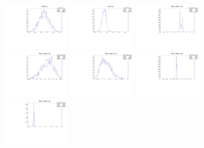 \begin{figure}[tb]
\begin{center}
	\includegraphics[width=0.3\textwidth]{figs/DataVars/DG_var.pdf}
	\includegraphics[width=0.3\textwidth]{figs/DataVars/Dm_var.pdf}
	\includegraphics[width=0.3\textwidth]{figs/DataVars/ds_m_dpe_1_var.pdf}
	\includegraphics[width=0.3\textwidth]{figs/DataVars/ds_m_dpe_2_var.pdf}
	\includegraphics[width=0.3\textwidth]{figs/DataVars/ds_m_dpe_3_var.pdf}
	\includegraphics[width=0.3\textwidth]{figs/DataVars/ds_m_dpe_4_var.pdf}
	\includegraphics[width=0.3\textwidth]{figs/DataVars/ds_m_dpe_5_var.pdf}

\end{center}
\end{figure}
